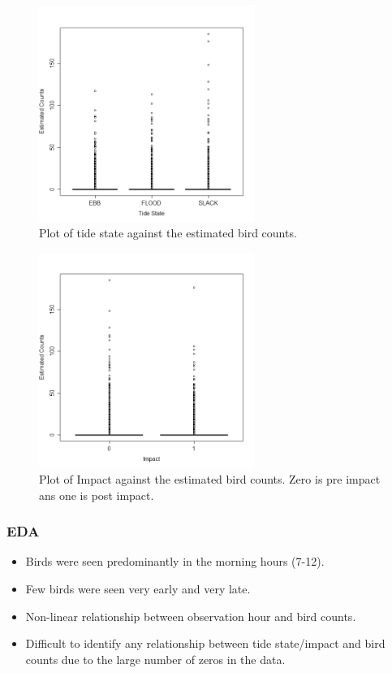 \documentclass[11pt, a4paper]{article}
\begin{document}
\begin{frame}
\begin{figure}[h]
  \centering
  \includegraphics[width=7cm]{floodebb.png}
\caption{Plot of tide state against the estimated bird counts.}
\label{fig:exploratory2}
\end{figure}
\end{frame}
\clearpage
\begin{frame}
\begin{figure}[h]
  \centering
  \includegraphics[width=7cm]{impact.png}
\caption{Plot of Impact against the estimated bird counts. Zero is pre impact ans one is post impact.}
\label{fig:exploratory3}
\end{figure}
\end{frame}


\begin{frame}
\frametitle{EDA}
\begin{itemize}
\item Birds were seen predominantly in the morning hours (7-12).
\item Few birds were seen very early and very late.  
\item Non-linear relationship between observation hour and bird counts.  
\item Difficult to identify any relationship between tide state/impact and bird counts due to the large number of zeros in the data.
\end{itemize}
\end{frame}
\end{document}
